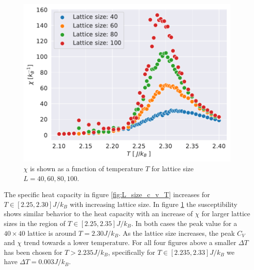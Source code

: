 \documentclass[english,notitlepage,reprint,nofootinbib]{revtex4-1}  %
\begin{document}
\begin{figure}[H]
    \centering
    \includegraphics[width=.5\textwidth]{../figures/L_size_X_T.pdf}
    \caption{$\chi$ is shown as a function of temperature $T$ for lattice size $L= 40, 60,80,100$.}
    \label{fig:L_size_X_T}
\end{figure}
The specific heat capacity in figure \ref{fig:L_size_c_v_T} increases for $T \in [2.25,2.30]J/k_B$ with increasing lattice size. In figure \ref{fig:L_size_X_T} the susceptibility shows similar behavior to the heat capacity with an increase of $\chi$ for larger lattice sizes in the region of  $T \in [2.25,2.35]J/k_B$. In both cases the peak value for a $40 \times 40$ lattice is around $T=2.30J/k_B$. As the lattice size increases, the peak $C_V$ and $\chi$ trend towards a lower temperature. For all four figures above a smaller $\Delta T$ has been chosen for $T > 2.235J/k_B$, specifically for  $T \in [2.235,2.33]J/k_B$ we have $\Delta T = 0.003J/k_B$.
\end{document}
